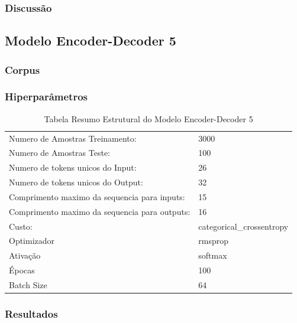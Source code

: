 \subsubsection{Discussão}
 
 \subsection{Modelo Encoder-Decoder 5}

\subsubsection{Corpus}
\subsubsection{Hiperparâmetros} 

\begin{table}[h]
\centering
\begin{tabular}{ll}
Numero de Amostras Treinamento: & 3000 \\
Numero de Amostras Teste: & 100 \\
Numero de tokens unicos do Input: & 26 \\
Numero de tokens unicos do Output: & 32 \\
Comprimento maximo da sequencia para inputs: & 15 \\
Comprimento maximo da sequencia para outputs: & 16 \\
Custo: & categorical\_crossentropy \\
Optimizador & rmsprop \\
Ativação & softmax \\
Épocas & 100 \\
Batch Size & 64
\end{tabular}
\caption{Tabela Resumo Estrutural do Modelo Encoder-Decoder 5}
\label{tab:res5}
\end{table}

\subsubsection{Resultados}

